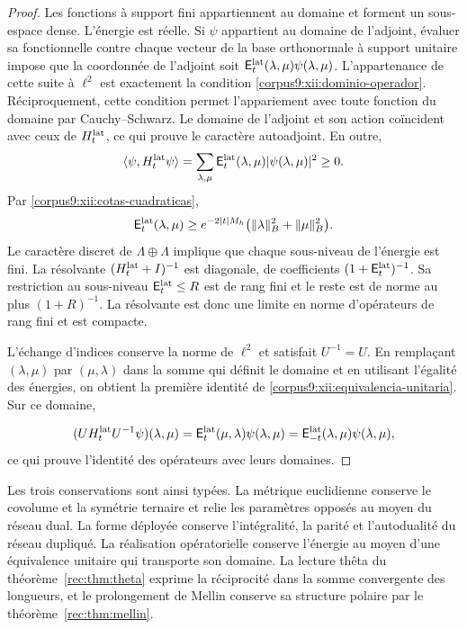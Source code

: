 \begin{proof}
Les fonctions à support fini appartiennent au domaine et forment un
sous-espace dense. L’énergie est réelle. Si \(\psi\) appartient au domaine
de l’adjoint, évaluer sa fonctionnelle contre chaque vecteur de la base
orthonormale à support unitaire impose que la coordonnée de l’adjoint
soit \(\mathsf E_t^{\rm lat}(\lambda,\mu)\psi(\lambda,\mu)\).
L’appartenance de cette suite à \(\ell^2\) est exactement la condition
\eqref{corpus9:xii:dominio-operador}. Réciproquement, cette condition
permet l’appariement avec toute fonction du domaine par
Cauchy--Schwarz. Le domaine de l’adjoint et son action coïncident avec ceux
de \(H_t^{\rm lat}\), ce qui prouve le caractère autoadjoint. En outre,
\[
 \langle\psi,H_t^{\rm lat}\psi\rangle
 =\sum_{\lambda,\mu}\mathsf E_t^{\rm lat}(\lambda,\mu)
                         |\psi(\lambda,\mu)|^2\geq0.
\]
Par \eqref{corpus9:xii:cotas-cuadraticas},
\[
 \mathsf E_t^{\rm lat}(\lambda,\mu)
 \geq e^{-2|t|M_h}
       \bigl(\|\lambda\|_B^2+\|\mu\|_B^2\bigr).
\]
Le caractère discret de \(\Lambda\oplus\Lambda\) implique que chaque sous-niveau
de l’énergie est fini. La résolvante \((H_t^{\rm lat}+I)^{-1}\)
est diagonale, de coefficients \((1+\mathsf E_t^{\rm lat})^{-1}\).
Sa restriction au sous-niveau \(\mathsf E_t^{\rm lat}\leq R\) est de
rang fini et le reste est de norme au plus \((1+R)^{-1}\).
La résolvante est donc une limite en norme d’opérateurs de rang
fini et est compacte.

L’échange d’indices conserve la norme de \(\ell^2\) et satisfait
\(U^{-1}=U\). En remplaçant \((\lambda,\mu)\) par \((\mu,\lambda)\)
dans la somme qui définit le domaine et en utilisant l’égalité des énergies,
on obtient la première identité de
\eqref{corpus9:xii:equivalencia-unitaria}. Sur ce domaine,

\[
 (UH_t^{\rm lat}U^{-1}\psi)(\lambda,\mu)
 =\mathsf E_t^{\rm lat}(\mu,\lambda)\psi(\lambda,\mu)
 =\mathsf E_{-t}^{\rm lat}(\lambda,\mu)\psi(\lambda,\mu),
\]
ce qui prouve l’identité des opérateurs avec leurs domaines.

\end{proof}

Les trois conservations sont ainsi typées. La métrique euclidienne
conserve le covolume et la symétrie ternaire et relie les paramètres
opposés au moyen du réseau dual. La forme déployée conserve l’intégralité,
la parité et l’autodualité du réseau dupliqué. La réalisation opératorielle
conserve l’énergie au moyen d’une équivalence unitaire qui transporte
son domaine. La lecture thêta du théorème~\ref{rec:thm:theta} exprime
la réciprocité dans la somme convergente des longueurs, et le prolongement
de Mellin conserve sa structure polaire par le
théorème~\ref{rec:thm:mellin}.

